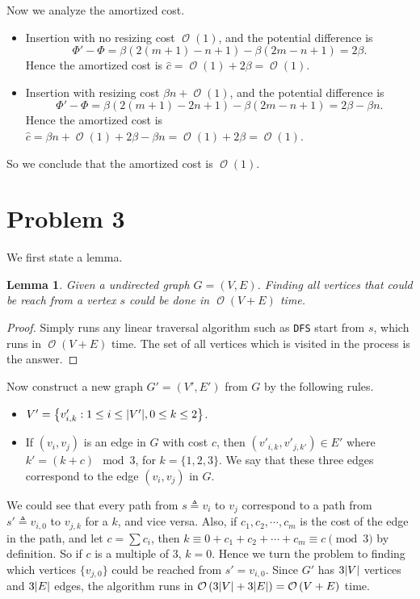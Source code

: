 \documentclass[12pt, a4paper]{article}
\DeclarePairedDelimiter{\abs}{\lvert}{\rvert}
\newcommand{\opord}{\operatorname{\mathcal{O}}}
\newcommand{\ord}[1]{\opord\left(#1\right)}
\newtheorem{lemma}{Lemma}
\begin{document}
Now we analyze the amortized cost. 
\begin{itemize}
  \item Insertion with no resizing cost $\ord{1}$, 
    and the potential difference is \\
    \[ \Phi' - \Phi = \beta (2(m+1) - n + 1) - \beta (2m - n + 1) = 2\beta. \]
    Hence the amortized cost is $\hat{c} = \ord{1} + 2\beta = \ord{1}$.

  \item Insertion with resizing cost $\beta n + \ord{1}$, 
    and the potential difference is \\
    \[ \Phi' - \Phi = \beta (2(m+1) - 2n + 1) - \beta (2m - n + 1) = 2\beta - \beta n. \]
    Hence the amortized cost is $\hat{c} = \beta n + \ord{1} + 2\beta - \beta n = \ord{1} + 2\beta = \ord{1}$.
\end{itemize}
So we conclude that the amortized cost is $\ord{1}$.

\section{Problem 3}
We first state a lemma.
\begin{lemma}
  Given a undirected graph $G = (V, E)$. Finding all vertices that could be reach from
  a vertex $s$ could be done in $\ord{V + E}$ time.
\end{lemma}
\begin{proof}
  Simply runs any linear traversal algorithm such as \texttt{DFS} start from $s$,
  which runs in $\ord{V + E}$ time. The set of all vertices which is visited in the process
  is the answer.
\end{proof}

Now construct a new graph $G' = (V', E')$ from $G$ by the following rules.
\begin{itemize}
  \item $V' = \big\{ v'_{i, k} : 1 \leq i \leq \abs{V'}, 0 \leq k \leq 2 \big\}$.
  \item If $(v_i, v_j)$ is an edge in $G$ with cost $c$, then
    $(v'_{i, k}, v'_{j, k'}) \in E'$ where $k' = (k + c) \mod 3$, for $k = \{1, 2, 3\}$.
    We say that these three edges correspond to the edge $(v_i, v_j)$ in $G$.
\end{itemize}
We could see that every path from $s \triangleq v_i$ to $v_j$ correspond to a path from
$s' \triangleq v_{i, 0}$ to $v_{j, k}$ for a $k$, and vice versa. Also, if $c_1, c_2, \cdots, c_m$
is the cost of the edge in the path, and let $c = \sum c_i$, then 
$k \equiv 0 + c_1 + c_2 + \cdots + c_m \equiv c \pmod{3}$ by definition. So if
$c$ is a multiple of $3$, $k = 0$. Hence we turn the problem to finding which
vertices $\{v_{j, 0}\}$ could be reached from $s' = v_{i, 0}$. Since $G'$ has
$3\abs{V}$ vertices and $3\abs{E}$ edges, the algorithm runs in
$\ord{3 \abs{V} + 3\abs{E}} = \ord{V + E}$ time.
\end{document}
